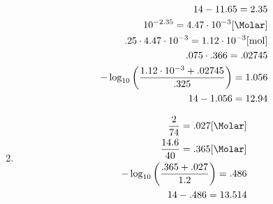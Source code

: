 \documentclass[12pt]{article}
\begin{document}
\begin{enumerate}
    \begin{equation}
      \begin{split}
        14-11.65=2.35\\
        10^{-2.35}=4.47\cdot10^{-3}[\si{\Molar}]\\
        .25\cdot4.47\cdot10^{-3}=1.12\cdot10^{-3}[\si{\mole}]\\
        .075\cdot.366=.02745\\
        -\log_{10}\left( \frac{1.12\cdot10^{-3}+.02745}{.325} \right)=1.056\\
        14-1.056=12.94
      \end{split}
      \label{5}
    \end{equation}

  \item

    \begin{equation}
      \begin{split}
        \frac{2}{74}=.027[\si{\Molar}]\\
        \frac{14.6}{40}=.365[\si{\Molar}]\\
        -\log_{10}\left( \frac{.365+.027}{1.2}  \right)=.486\\
        14-.486=13.514
      \end{split}
      \label{6}
    \end{equation}

\end{enumerate}
\end{document}

